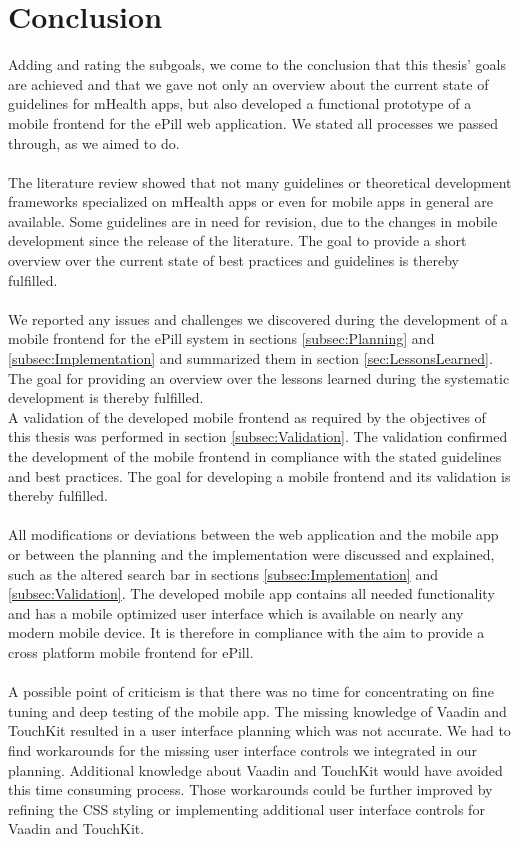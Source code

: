 \section{Conclusion}
Adding and rating the subgoals, we come to the conclusion that this thesis' goals are achieved and that we gave not only an overview about the current state of guidelines for mHealth apps, but also developed a functional prototype of a mobile frontend for the ePill web application. We stated all processes we passed through, as we aimed to do. 
\\
\\
The literature review showed that not many guidelines or theoretical development frameworks specialized on mHealth apps or even for mobile apps in general are available. Some guidelines are in need for revision, due to the changes in mobile development since the release of the literature. The goal to provide a short overview over the current state of best practices and guidelines is thereby fulfilled.
\\
\\
We reported any issues and challenges we discovered during the development of a mobile frontend for the ePill system in sections \ref{subsec:Planning} and \ref{subsec:Implementation} and summarized them in section \ref{sec:LessonsLearned}. The goal for providing an overview over the lessons learned during the systematic development is thereby fulfilled. 
\\
A validation of the developed mobile frontend as required by the objectives of this thesis was performed in section \ref{subsec:Validation}. The validation confirmed the development of the mobile frontend in compliance with the stated guidelines and best practices. The goal for developing a mobile frontend and its validation is thereby fulfilled.
\\
\\
All modifications or deviations between the web application and the mobile app or between the planning and the implementation were discussed and explained, such as the altered search bar in sections \ref{subsec:Implementation} and \ref{subsec:Validation}. The developed mobile app contains all needed functionality and has a mobile optimized user interface which is available on nearly any modern mobile device. It is therefore in compliance with the aim to provide a cross platform mobile frontend for ePill.
\\
\\
A possible point of criticism is that there was no time for concentrating on fine tuning and deep testing of the mobile app. The missing knowledge of Vaadin and TouchKit resulted in a user interface planning which was not accurate. We had to find workarounds for the missing user interface controls we integrated in our planning. Additional knowledge about Vaadin and TouchKit would have avoided this time consuming process. Those workarounds could be further improved by refining the CSS styling or implementing additional user interface controls for Vaadin and TouchKit.
